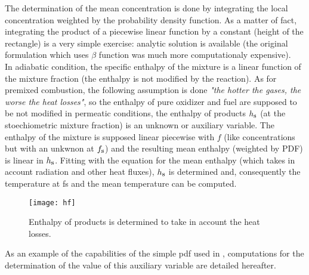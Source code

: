 The determination of the mean concentration is done by integrating the local
concentration weighted by the probability density function. As a matter of fact,
integrating the product of a piecewise linear function by a constant (height of
the rectangle) is a very simple exercise: analytic
solution is available (the original formulation \cite{Borghi:1978a} which uses $\beta$ function was much more computationaly expensive).\\
In adiabatic condition, the specific enthalpy of the mixture is a linear
function of the mixture fraction (the enthalpy is not modified by the
reaction). As for premixed combustion, the following assumption is done
\textit{"the hotter the gases, the worse the heat losses"}, so the enthalpy of
pure oxidizer and fuel are supposed to be not modified in permeatic conditions,
the enthalpy of products $h_{\mbox{\footnotesize s}}$ (at the stoechiometric
mixture fraction) is an unknown or auxiliary variable. The enthalpy of the
mixture is supposed linear piecewise with $f$ (like concentrations but with an
unkwnon at $f_{\mbox{\footnotesize s}}$) and the resulting mean enthalpy
(weighted by PDF) is linear in $h_{\mbox{\footnotesize s}}$.  Fitting with the
equation for the mean enthalpy (which takes in account radiation and other heat
fluxes), $h_{\mbox{\footnotesize s}}$ is determined and, consequently the
temperature at fs and the mean temperature can be computed.

\begin{figure}[!htbp]
\centerline{\texttt{[image: hf]}}
\caption{Enthalpy of products is determined to take in account the heat losses.}
\end{figure}
As an example of the capabilities of the simple pdf used in \CS, computations
for the determination of the value of this auxiliary variable are detailed
hereafter.

